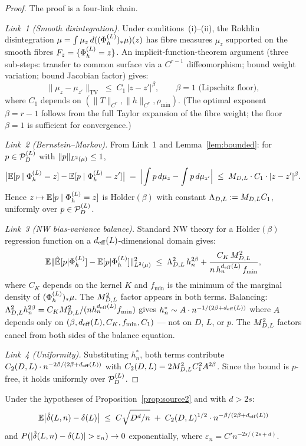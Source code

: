\begin{proof}
The proof is a four-link chain.

\emph{Link~1 (Smooth disintegration).}
Under conditions~(i)--(ii), the Rokhlin disintegration
$\mu = \int \mu_z\,d((\Phi_h^{(L)})_*\mu)(z)$ has fibre measures $\mu_z$ supported on
the smooth fibres $F_z = \{\Phi_h^{(L)} = z\}$.
An implicit-function-theorem argument (three sub-steps: transfer to common
surface via a $C^{r-1}$ diffeomorphism; bound weight variation; bound
Jacobian factor) gives:
\[
  \|\mu_z - \mu_{z'}\|_{\mathrm{TV}} \;\leq\; C_1\,|z - z'|^\beta,
  \qquad \beta = 1 \text{ (Lipschitz floor)},
\]
where $C_1$ depends on $(\|T\|_{C^r}, \|h\|_{C^r}, \rho_{\min})$.
(The optimal exponent $\beta = r-1$ follows from the full Taylor expansion of
the fibre weight; the floor $\beta = 1$ is sufficient for convergence.)

\emph{Link~2 (Bernstein--Markov).}
From Link~1 and Lemma~\ref{lem:bounded}: for $p \in \mathcal{P}_D^{(L)}$ with
$\|p\|_{L^{2}(\mu)} \leq 1$,
\[
  \bigl|\mathbb{E}[p \mid \Phi_h^{(L)} = z] - \mathbb{E}[p \mid \Phi_h^{(L)} = z']\bigr|
  \;=\; \Bigl|\int p\,d\mu_z - \int p\,d\mu_{z'}\Bigr|
  \;\leq\; M_{D,L} \cdot C_1 \cdot |z - z'|^\beta.
\]
Hence $z \mapsto \mathbb{E}[p \mid \Phi_h^{(L)} = z]$ is $\mathrm{H\ddot{o}lder}(\beta)$
with constant $\Lambda_{D,L} := M_{D,L} C_1$, uniformly over $p \in \mathcal{P}_D^{(L)}$.

\emph{Link~3 (NW bias-variance balance).}
Standard NW theory \cite{Gyorfi2002} for a $\mathrm{H\ddot{o}lder}(\beta)$
regression function on a $d_{\mathrm{eff}}(L)$-dimensional domain gives:
\[
  \mathbb{E}\|\hat{\mathbb{E}}[p|\Phi_h^{(L)}] - \mathbb{E}[p|\Phi_h^{(L)}]\|_{L^{2}(\mu)}^2
  \;\leq\; \Lambda_{D,L}^2\,h_n^{2\beta}
    + \frac{C_K\,M_{D,L}^2}{n\,h_n^{d_{\mathrm{eff}}(L)}\,f_{\min}},
\]
where $C_K$ depends on the kernel $K$ and $f_{\min}$ is the minimum of the
marginal density of $(\Phi_h^{(L)})_*\mu$.
The $M_{D,L}^2$ factor appears in both terms.
Balancing: $\Lambda_{D,L}^2 h_n^{2\beta} = C_K M_{D,L}^2 / (n h_n^{d_{\mathrm{eff}}(L)} f_{\min})$
gives $h_n^* \sim A \cdot n^{-1/(2\beta+d_{\mathrm{eff}}(L))}$ where $A$ depends only
on $(\beta, d_{\mathrm{eff}}(L), C_K, f_{\min}, C_1)$ --- not on $D$, $L$, or $p$.
The $M_{D,L}^2$ factors cancel from both sides of the balance equation.

\emph{Link~4 (Uniformity).}
Substituting $h_n^*$, both terms contribute
$C_2(D,L) \cdot n^{-2\beta/(2\beta+d_{\mathrm{eff}}(L))}$ with
$C_2(D,L) = 2M_{D,L}^2 C_1^2 A^{2\beta}$.
Since the bound is $p$-free, it holds uniformly over $\mathcal{P}_D^{(L)}$.
\end{proof}

\begin{theorem}
\label{thm:convergence}
Under the hypotheses of Proposition~\ref{prop:source2} and with $d > 2s$:
\[
  \mathbb{E}\bigl|\hat{\delta}(L,n) - \delta(L)\bigr|
  \;\leq\;
  C\sqrt{D^d/n}
  \;+\; C_2(D,L)^{1/2} \cdot n^{-\beta/(2\beta+d_{\mathrm{eff}}(L))}
\]
and $P(|\hat{\delta}(L,n) - \delta(L)| > \varepsilon_n) \to 0$ exponentially,
where $\varepsilon_n = C' n^{-2s/(2s+d)}$.
\end{theorem}

